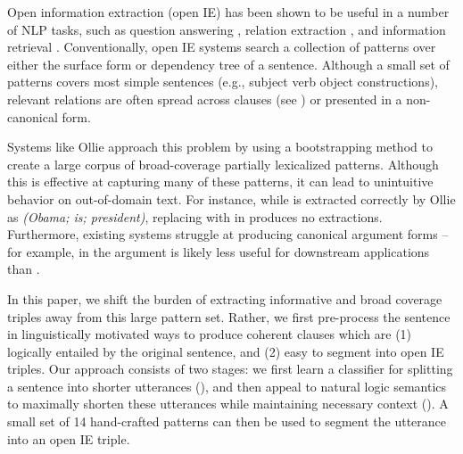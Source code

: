 Open information extraction (open IE) has been shown to be useful in a
  number of NLP tasks, such as question answering \cite{key:2014fader-openqa},
  relation extraction \cite{key:2010soderland-adapting}, 
  and information retrieval \cite{key:2011etzioni-nature}.
Conventionally, open IE systems search a collection of patterns over either
  the surface form or dependency tree of a sentence.
Although a small set of patterns covers most simple sentences 
  (e.g., subject verb object constructions),
  relevant relations are often spread across clauses (see
  ) or presented in a non-canonical form.

Systems like Ollie \cite{key:2012mausam-ollie} approach this problem by 
  using a bootstrapping method to create a large corpus of broad-coverage
  partially lexicalized patterns.
Although this is effective at capturing many of these patterns,
  it can lead to unintuitive behavior on out-of-domain text.
For instance, while  is extracted correctly by Ollie
  as \textit{(Obama; is; president)}, replacing  with  in 
   produces no extractions.
Furthermore, existing systems struggle at producing
  canonical argument forms -- for example, in  the argument
   is likely less useful for downstream
  applications than .

In this paper, we shift the burden of extracting informative and broad
  coverage triples away from this large pattern set.
Rather, we first pre-process the sentence in linguistically motivated ways
  to produce coherent clauses which are (1) logically entailed by the 
  original sentence, and (2) easy to segment into open IE triples.
Our approach consists of two stages:
  we first learn a classifier for splitting a sentence into shorter
  utterances (), 
  and then appeal to natural logic \cite{key:1991valencia-natlog}
  semantics to maximally
  shorten these utterances while maintaining necessary context ().
A small set of 14 hand-crafted patterns can then be used to segment the
  utterance into an open IE triple.

